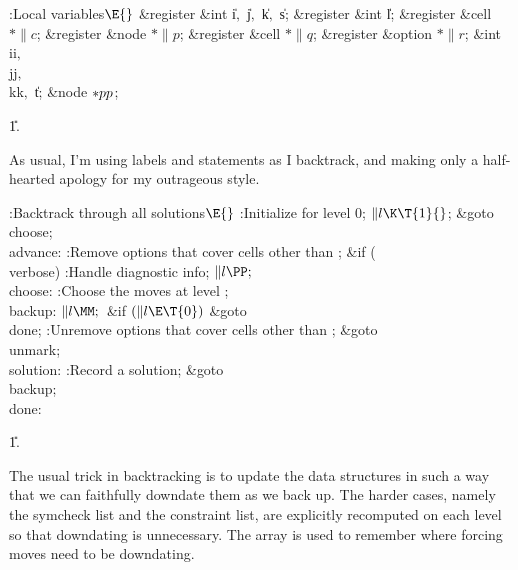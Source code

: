 \B{}:Local variables\X${}\E{}$\6
\&{register} \&{int} \|i${},{}$ \|j${},{}$ \|k${},{}$ \|s;\6
\&{register} \&{int} \|l;\6
\&{register} \&{cell} ${}{*}\|c{}$;\6
\&{register} \&{node} ${}{*}\|p{}$;\6
\&{register} \&{cell} ${}{*}\|q{}$;\6
\&{register} \&{option} ${}{*}\|r{}$;\6
\&{int} \\{ii}${},{}$ \\{jj}${},{}$ \\{kk}${},{}$ \|t;\6
\&{node} ${}{*}\\{pp}{}$;\par
\U1.\fi

As usual, I'm using labels and  statements
as I backtrack,
and making only a half-hearted apology for my outrageous style.

\Y\B\4:Backtrack through all solutions\X${}\E{}$\6
:Initialize for level 0\X;\6
${}\|l\K\T{1}{}$;\5
\&{goto} \\{choose};\6
\4\\{advance}:\5
:Remove options that cover cells other than \X;\6
\&{if} (\\{verbose})\1\5
:Handle diagnostic info\X;\2\6
${}\|l\PP;{}$\6
\4\\{choose}:\5
:Choose the moves at level \X;\6
\4\\{backup}:\5
${}\|l\MM;{}$\6
\&{if} ${}(\|l\E\T{0}){}$\1\5
\&{goto} \\{done};\2\6
:Unremove options that cover cells other than \X;\6
\&{goto} \\{unmark};\6
\4\\{solution}:\5
:Record a solution\X;\6
\&{goto} \\{backup}; \\{done}:\par
\U1.\fi

The usual trick in backtracking is to update the data
structures in such a
way that we can faithfully downdate them as we back up. The harder cases,
namely the symcheck list and the constraint list, are explicitly recomputed on
each level so that downdating is unnecessary. The  array is
used to
remember where forcing moves need to be downdating.

